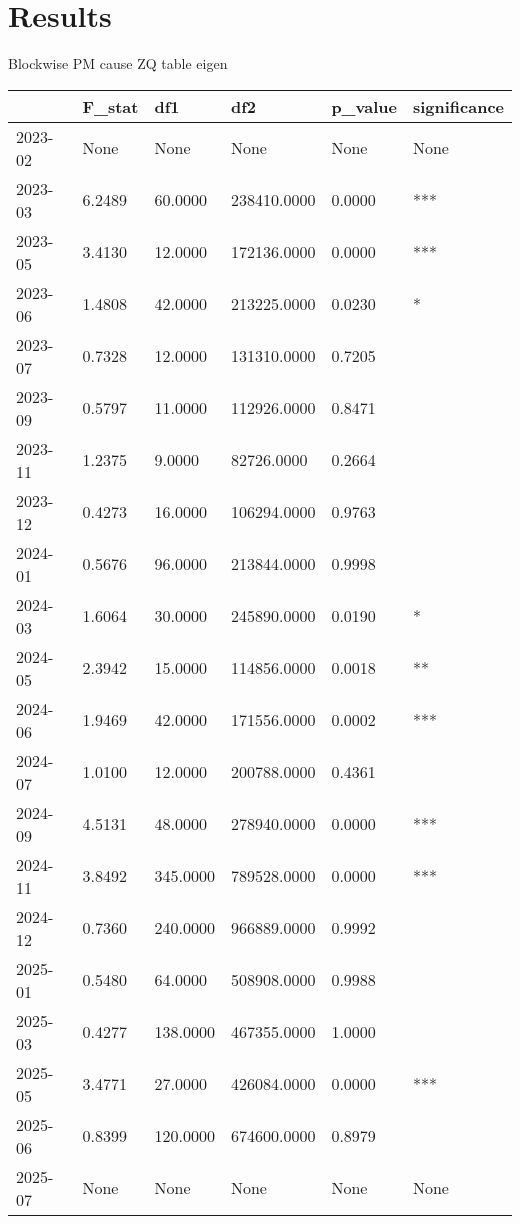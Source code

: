 \section{Results}


Blockwise PM cause ZQ table eigen

\begin{center}
  \begin{tabular}{l|l|l|l|l|l}
    \hline
  & F\_stat & df1 & df2 & p\_value & significance\\
  \hline
    2023-02 & None & None & None & None & None\\
    \hline
    2023-03 & 6.2489 & 60.0000 & 238410.0000 & 0.0000 & ***\\
    \hline
    2023-05 & 3.4130 & 12.0000 & 172136.0000 & 0.0000 & ***\\
    \hline
    2023-06 & 1.4808 & 42.0000 & 213225.0000 & 0.0230 & *\\
    \hline
    2023-07 & 0.7328 & 12.0000 & 131310.0000 & 0.7205 & \\
    \hline
    2023-09 & 0.5797 & 11.0000 & 112926.0000 & 0.8471 & \\
    \hline
    2023-11 & 1.2375 & 9.0000 & 82726.0000 & 0.2664 & \\
    \hline
    2023-12 & 0.4273 & 16.0000 & 106294.0000 & 0.9763 & \\
    \hline
    2024-01 & 0.5676 & 96.0000 & 213844.0000 & 0.9998 & \\
    \hline
    2024-03 & 1.6064 & 30.0000 & 245890.0000 & 0.0190 & *\\
    \hline
    2024-05 & 2.3942 & 15.0000 & 114856.0000 & 0.0018 & **\\
    \hline
    2024-06 & 1.9469 & 42.0000 & 171556.0000 & 0.0002 & ***\\
    \hline
    2024-07 & 1.0100 & 12.0000 & 200788.0000 & 0.4361 & \\
    \hline
    2024-09 & 4.5131 & 48.0000 & 278940.0000 & 0.0000 & ***\\
    \hline
    2024-11 & 3.8492 & 345.0000 & 789528.0000 & 0.0000 & ***\\
    \hline
    2024-12 & 0.7360 & 240.0000 & 966889.0000 & 0.9992 & \\
    \hline
    2025-01 & 0.5480 & 64.0000 & 508908.0000 & 0.9988 & \\
    \hline
    2025-03 & 0.4277 & 138.0000 & 467355.0000 & 1.0000 & \\
    \hline
    2025-05 & 3.4771 & 27.0000 & 426084.0000 & 0.0000 & ***\\
    \hline
    2025-06 & 0.8399 & 120.0000 & 674600.0000 & 0.8979 & \\
    \hline
    2025-07 & None & None & None & None & None\\
    \hline
  \end{tabular}
\end{center}



